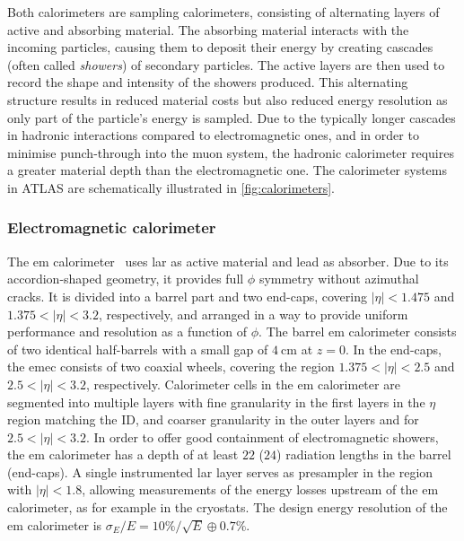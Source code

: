 Both calorimeters are sampling calorimeters, consisting of alternating layers of active and absorbing material.
The absorbing material interacts with the incoming particles, causing them to deposit their energy by creating cascades (often called \textit{showers}) of secondary particles.
The active layers are then used to record the shape and intensity of the showers produced.
This alternating structure results in reduced material costs but also reduced energy resolution as only part of the particle's energy is sampled.
Due to the typically longer cascades in hadronic interactions compared to electromagnetic ones, and in order to minimise punch-through into the muon system, the hadronic calorimeter requires a greater material depth than the electromagnetic one.
The calorimeter systems in ATLAS are schematically illustrated in \cref{fig:calorimeters}.

\subsubsection{Electromagnetic calorimeter}

The \gls{em} calorimeter~\cite{Aad:2008zzm} uses \gls{lar} as active material and lead as absorber.
Due to its accordion-shaped geometry, it provides full $\phi$ symmetry without azimuthal cracks.
It is divided into a barrel part and two end-caps, covering $\vert\eta\vert <1.475$ and $1.375 < \vert\eta\vert <3.2$, respectively, and arranged in a way to provide uniform performance and resolution as a function of $\phi$.
The barrel \gls{em} calorimeter consists of two identical half-barrels with a small gap of $\SI{4}{\centi\meter}$ at $z=0$. In the end-caps, the \gls{emec} consists of two coaxial wheels, covering the region $1.375 < \vert\eta\vert <2.5$ and $2.5 < \vert\eta\vert <3.2$, respectively.
Calorimeter cells in the \gls{em} calorimeter are segmented into multiple layers with fine granularity in the first layers in the $\eta$ region matching the ID, and coarser granularity in the outer layers and for $2.5 < \vert\eta\vert <3.2$.
In order to offer good containment of electromagnetic showers, the \gls{em} calorimeter has a depth of at least $22$ ($24$) radiation lengths in the barrel (end-caps).
A single instrumented \gls{lar} layer serves as presampler in the region with $\vert\eta\vert <1.8$, allowing measurements of the energy losses upstream of the \gls{em} calorimeter, as for example in the cryostats.
The design energy resolution of the \gls{em} calorimeter is $\sigma_E / E = 10\% / \sqrt{E} \oplus 0.7\%$.

